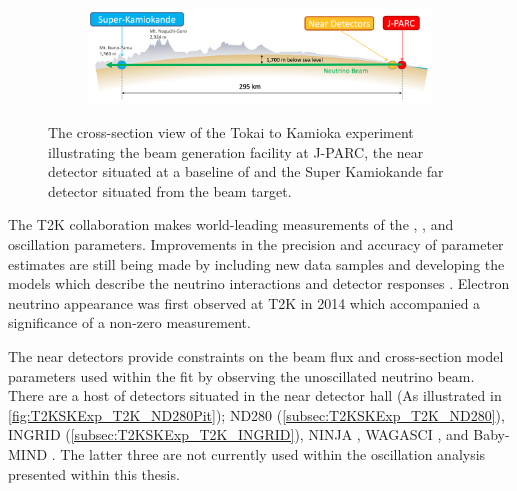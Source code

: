 \begin{figure}[h]
  \begin{subfigure}[t]{0.95\textwidth}
    \includegraphics[width=\textwidth, trim={0mm 0mm 0mm 0mm}, clip,page=1]{Figures/Detectors/T2KCrossSection.pdf}
  \end{subfigure}
  \caption{The cross-section view of the Tokai to Kamioka experiment illustrating the beam generation facility at J-PARC, the near detector situated at a baseline of  and the Super Kamiokande far detector situated  from the beam target.}
  \label{fig:T2KSKExp_T2K_Overview}
\end{figure}

The T2K collaboration makes world-leading measurements of the \sinsqatm, \delmsqatm, and \dcp oscillation parameters. Improvements in the precision and accuracy of parameter estimates are still being made by including new data samples and developing the models which describe the neutrino interactions and detector responses . Electron neutrino appearance was first observed at T2K in 2014 \cite{2014_Abe_ElectronNuApp} which accompanied a \quickmath{7.3\sigma} significance of a non-zero \sinsqreac measurement.

The near detectors provide constraints on the beam flux and cross-section model parameters used within the fit by observing the unoscillated neutrino beam. There are a host of detectors situated in the near detector hall (As illustrated in \autoref{fig:T2KSKExp_T2K_ND280Pit}); ND280 (\autoref{subsec:T2KSKExp_T2K_ND280}), INGRID (\autoref{subsec:T2KSKExp_T2K_INGRID}), NINJA \cite{ninja}, WAGASCI \cite{wagasci}, and Baby-MIND \cite{baby_mind}. The latter three are not currently used within the oscillation analysis presented within this thesis.

